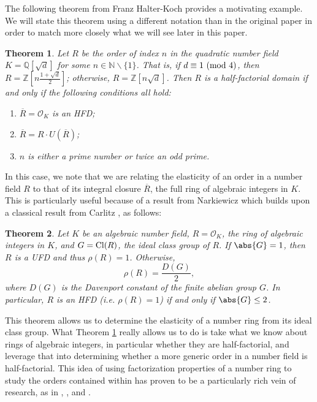 \documentclass[12pt]{amsart}
\newtheorem{theorem}{Theorem}[section]
\theoremstyle{definition}
\newcommand{\bZ}{\mathbb Z}
\newcommand{\bQ}{\mathbb Q}
\newcommand{\bN}{\mathbb N}
\newcommand{\Rbar}{\overline{R}}
\newcommand{\Cl}{\textup{Cl}}
\newcommand{\modulo}[1]{\textup{ (mod }#1)}
\newcommand{\cO}{\mathcal{O}}
\begin{document}
	The following theorem from Franz Halter-Koch \cite{halter-koch} provides a motivating example. We will state this theorem using a different notation than in the original paper in order to match more closely what we will see later in this paper.
	\begin{theorem}
		\label{halter}
		Let $R$ be the order of index $n$ in the quadratic number field $K=\bQ[\sqrt{d}]$ for some $n\in\bN\backslash\{1\}$. That is, if $d\equiv 1\modulo{4}$, then $R=\bZ[n\frac{1+\sqrt{d}}{2}]$; otherwise, $R=\bZ[n\sqrt{d}]$. Then $R$ is a half-factorial domain if and only if the following conditions all hold:
		\begin{enumerate}
			\item $\Rbar=\cO_K$ is an HFD;
			\item $\Rbar=R\cdot U(\Rbar)$;
			\item $n$ is either a prime number or twice an odd prime.
		\end{enumerate}
	\end{theorem}
	
	In this case, we note that we are relating the elasticity of an order in a number field $R$ to that of its integral closure $\Rbar$, the full ring of algebraic integers in $K$. This is particularly useful because of a result from Narkiewicz \cite{narkiewicz} which builds upon a classical result from Carlitz \cite{carlitz}, as follows:
	\begin{theorem}
		\label{davenport elasticity}
		Let $K$ be an algebraic number field, $R=\cO_K$, the ring of algebraic integers in $K$, and $G=\Cl(R)$, the ideal class group of $R$. If $\abs{G}=1$, then $R$ is a UFD and thus $\rho(R)=1$. Otherwise,
		$$\rho(R)=\frac{D(G)}{2},$$ where $D(G)$ is the Davenport constant of the finite abelian group $G$. In particular, $R$ is an HFD (i.e. $\rho(R)=1$) if and only if $\abs{G}\leq 2$.
	\end{theorem}
	
	This theorem allows us to determine the elasticity of a number ring from its ideal class group. What Theorem \ref{halter} really allows us to do is take what we know about rings of algebraic integers, in particular whether they are half-factorial, and leverage that into determining whether a more generic order in a number field is half-factorial. This idea of using factorization properties of a number ring to study the orders contained within has proven to be a particularly rich vein of research, as in \cite{choi2024class}, \cite{Kettinger2024}, and \cite{primeconductor}.
	
\end{document}
